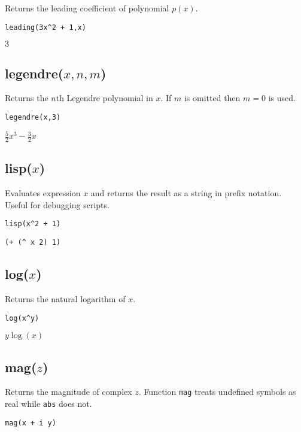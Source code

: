 Returns the leading coefficient of polynomial $p(x)$.

{\color{blue}
\begin{verbatim}
leading(3x^2 + 1,x)
\end{verbatim}
}

\noindent
$3$

\subsection*{legendre($x,n,m$)}

Returns the $n$th Legendre polynomial in $x$.
If $m$ is omitted then $m=0$ is used.

{\color{blue}
\begin{verbatim}
legendre(x,3)
\end{verbatim}
}

\noindent
$\displaystyle \tfrac{5}{2}x^3-\tfrac{3}{2}x$

\subsection*{lisp($x$)}

Evaluates expression $x$ and returns the result as a
string in prefix notation.
Useful for debugging scripts.

{\color{blue}
\begin{verbatim}
lisp(x^2 + 1)
\end{verbatim}
}

\noindent
\verb$(+ (^ x 2) 1)$

\subsection*{log($x$)}

Returns the natural logarithm of $x$.

{\color{blue}
\begin{verbatim}
log(x^y)
\end{verbatim}
}

\noindent
$y\log(x)$

\subsection*{mag($z$)}

Returns the magnitude of complex $z$.
Function {\tt mag} treats undefined symbols as real while {\tt abs} does not.

{\color{blue}
\begin{verbatim}
mag(x + i y)
\end{verbatim}
}

